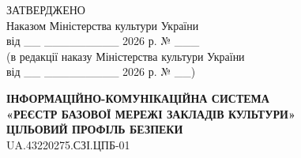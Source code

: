 \documentclass[10pt]{article}
\begin{document}
\begin{flushright}
ЗАТВЕРДЖЕНО\\
Наказом Міністерства культури України\\
від \_\_ \_\_\_\_\_\_\_\_\_ 2026 р. № \_\_\_\\
(в редакції наказу Міністерства культури України\\
від \_\_ \_\_\_\_\_\_\_\_\_ 2026 р. № \_\_)
\end{flushright}

\vspace{2cm}

\begin{center}
\textbf{\Large ІНФОРМАЦІЙНО-КОМУНІКАЦІЙНА СИСТЕМА}\\
\textbf{\Large «РЕЄСТР БАЗОВОЇ МЕРЕЖІ ЗАКЛАДІВ КУЛЬТУРИ»}\\
\vspace{1cm}
\textbf{\Large ЦІЛЬОВИЙ ПРОФІЛЬ БЕЗПЕКИ}\\
\vspace{0.5cm}
\large UA.43220275.СЗІ.ЦПБ-01
\end{center}

\newpage
\end{document}
